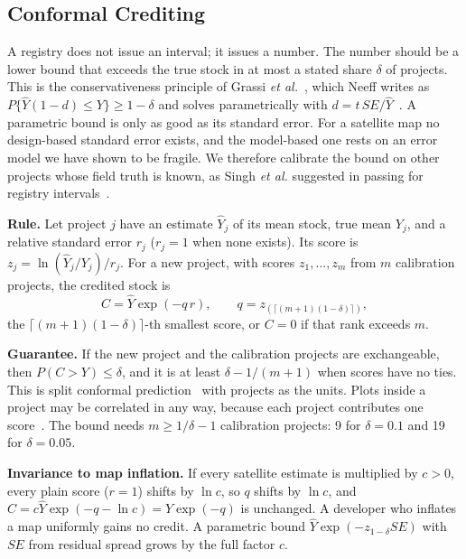 \documentclass[conference,a4paper]{IEEEtran}
\begin{document}
\subsection{Conformal Crediting}
\label{sec:ccmethod}
A registry does not issue an interval; it issues a number. The number should be a lower bound that exceeds the true stock in at most a stated share $\delta$ of projects. This is the conservativeness principle of Grassi \textit{et al.}~\cite{grassi2008applying}, which Neeff writes as $P\{\hat Y(1-d)\le Y\}\ge1-\delta$ and solves parametrically with $d=t\,SE/\hat Y$~\cite{neeff2021risk}. A parametric bound is only as good as its standard error. For a satellite map no design-based standard error exists, and the model-based one rests on an error model we have shown to be fragile. We therefore calibrate the bound on other projects whose field truth is known, as Singh \textit{et al.} suggested in passing for registry intervals~\cite{singh2024uncertainty}.

\textbf{Rule.} Let project $j$ have an estimate $\hat Y_j$ of its mean stock, true mean $Y_j$, and a relative standard error $r_j$ ($r_j=1$ when none exists). Its score is $z_j=\ln(\hat Y_j/Y_j)/r_j$. For a new project, with scores $z_1,\dots,z_m$ from $m$ calibration projects, the credited stock is
\begin{equation}
C=\hat Y\exp(-q\,r),\qquad q=z_{(\lceil (m+1)(1-\delta)\rceil)},
\label{eq:cc}
\end{equation}
the $\lceil (m+1)(1-\delta)\rceil$-th smallest score, or $C=0$ if that rank exceeds $m$.

\textbf{Guarantee.} If the new project and the calibration projects are exchangeable, then $P(C>Y)\le\delta$, and it is at least $\delta-1/(m+1)$ when scores have no ties. This is split conformal prediction~\cite{lei2018distribution} with projects as the units. Plots inside a project may be correlated in any way, because each project contributes one score~\cite{dunn2023distribution}. The bound needs $m\ge 1/\delta-1$ calibration projects: 9 for $\delta=0.1$ and 19 for $\delta=0.05$.

\textbf{Invariance to map inflation.} If every satellite estimate is multiplied by $c>0$, every plain score ($r=1$) shifts by $\ln c$, so $q$ shifts by $\ln c$, and $C=c\hat Y\exp(-q-\ln c)=\hat Y\exp(-q)$ is unchanged. A developer who inflates a map uniformly gains no credit. A parametric bound $\hat Y\exp(-z_{1-\delta}SE)$ with $SE$ from residual spread grows by the full factor $c$.
\end{document}

